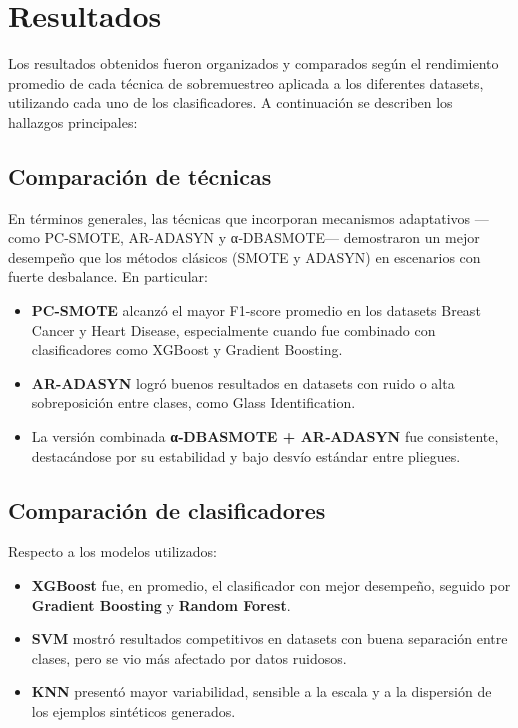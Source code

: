 \section{Resultados}

Los resultados obtenidos fueron organizados y comparados según el rendimiento promedio de cada técnica de sobremuestreo aplicada a los diferentes datasets, utilizando cada uno de los clasificadores. A continuación se describen los hallazgos principales:

\subsection{Comparación de técnicas}

En términos generales, las técnicas que incorporan mecanismos adaptativos —como PC-SMOTE, AR-ADASYN y α‑DBASMOTE— demostraron un mejor desempeño que los métodos clásicos (SMOTE y ADASYN) en escenarios con fuerte desbalance. En particular:

\begin{itemize}
  \item \textbf{PC-SMOTE} alcanzó el mayor F1-score promedio en los datasets Breast Cancer y Heart Disease, especialmente cuando fue combinado con clasificadores como XGBoost y Gradient Boosting.
  \item \textbf{AR-ADASYN} logró buenos resultados en datasets con ruido o alta sobreposición entre clases, como Glass Identification.
  \item La versión combinada \textbf{α‑DBASMOTE + AR‑ADASYN} fue consistente, destacándose por su estabilidad y bajo desvío estándar entre pliegues.
\end{itemize}

\subsection{Comparación de clasificadores}

Respecto a los modelos utilizados:

\begin{itemize}
  \item \textbf{XGBoost} fue, en promedio, el clasificador con mejor desempeño, seguido por \textbf{Gradient Boosting} y \textbf{Random Forest}.
  \item \textbf{SVM} mostró resultados competitivos en datasets con buena separación entre clases, pero se vio más afectado por datos ruidosos.
  \item \textbf{KNN} presentó mayor variabilidad, sensible a la escala y a la dispersión de los ejemplos sintéticos generados.
\end{itemize}

